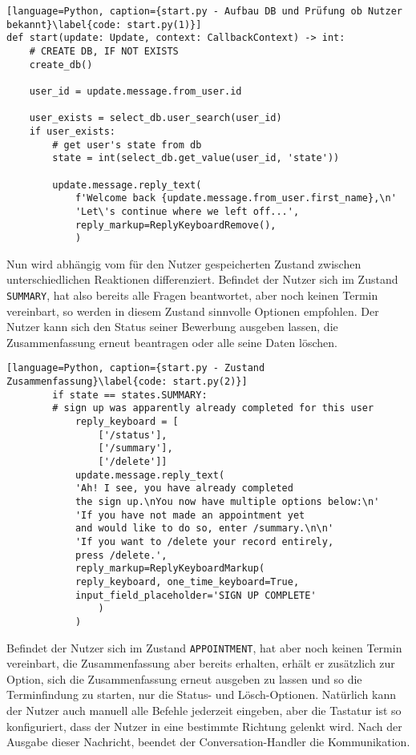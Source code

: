             \begin{lstlisting}[language=Python, caption={start.py - Aufbau DB und Prüfung ob Nutzer bekannt}\label{code: start.py(1)}]
def start(update: Update, context: CallbackContext) -> int:
    # CREATE DB, IF NOT EXISTS
    create_db()

    user_id = update.message.from_user.id

    user_exists = select_db.user_search(user_id)
    if user_exists:
        # get user's state from db
        state = int(select_db.get_value(user_id, 'state'))

        update.message.reply_text(
            f'Welcome back {update.message.from_user.first_name},\n'
            'Let\'s continue where we left off...',
            reply_markup=ReplyKeyboardRemove(),
            )
            \end{lstlisting}
            Nun wird abhängig vom für den Nutzer gespeicherten Zustand zwischen unterschiedlichen Reaktionen differenziert. Befindet der Nutzer sich im Zustand \verb|SUMMARY|, hat also bereits alle Fragen beantwortet, aber noch keinen Termin vereinbart, so werden in diesem Zustand sinnvolle Optionen empfohlen. Der Nutzer kann sich den Status seiner Bewerbung ausgeben lassen, die Zusammenfassung erneut beantragen oder alle seine Daten löschen.
            \begin{lstlisting}[language=Python, caption={start.py - Zustand Zusammenfassung}\label{code: start.py(2)}]
        if state == states.SUMMARY:  
        # sign up was apparently already completed for this user
            reply_keyboard = [
                ['/status'], 
                ['/summary'],
                ['/delete']]
            update.message.reply_text(
            'Ah! I see, you have already completed 
            the sign up.\nYou now have multiple options below:\n'
            'If you have not made an appointment yet 
            and would like to do so, enter /summary.\n\n'
            'If you want to /delete your record entirely, 
            press /delete.',
            reply_markup=ReplyKeyboardMarkup(
            reply_keyboard, one_time_keyboard=True, 
            input_field_placeholder='SIGN UP COMPLETE'
                )
            )
            \end{lstlisting}
            Befindet der Nutzer sich im Zustand \verb|APPOINTMENT|, hat aber noch keinen Termin vereinbart, die Zusammenfassung aber bereits erhalten, erhält er zusätzlich zur Option, sich die Zusammenfassung erneut ausgeben zu lassen und so die Terminfindung zu starten, nur die Status- und Lösch-Optionen. Natürlich kann der Nutzer auch manuell alle Befehle jederzeit eingeben, aber die Tastatur ist so konfiguriert, dass der Nutzer in eine bestimmte Richtung gelenkt wird. Nach der Ausgabe dieser Nachricht, beendet der Conversation-Handler die Kommunikation.
